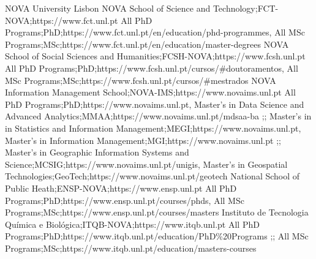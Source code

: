 \begin{ntUniversity}{NOVA University Lisbon}
             {{NOVA School of Science and Technology};{FCT-NOVA};{https://www.fct.unl.pt}}
             {{All PhD Programs};{PhD};{https://www.fct.unl.pt/en/education/phd-programmes},%
              {All MSc Programs};{MSc};{https://www.fct.unl.pt/en/education/master-degrees}}
             {{NOVA School of Social Sciences and  Humanities};{FCSH-NOVA};{https://www.fcsh.unl.pt}}
             {{All PhD Programs};{PhD};{https://www.fcsh.unl.pt/cursos/\#doutoramentos},%
              {All MSc Programs};{MSc};{https://www.fcsh.unl.pt/cursos/\#mestrados}}
             {{NOVA Information Management School};{NOVA-IMS};{https://www.novaims.unl.pt}}
             {{All PhD Programs};{PhD};{https://www.novaims.unl.pt},%
              {Master's in Data Science and Advanced Analytics};{MMAA};{https://www.novaims.unl.pt/mdsaa-ba}}
             {;;}
             {{Master's in in Statistics and Information Management};{MEGI};{https://www.novaims.unl.pt},%
              {Master's in Information Management};{MGI};{https://www.novaims.unl.pt}}
             {;;}
             {{Master's in Geographic Information Systems and Science};{MCSIG};{https://www.novaims.unl.pt/unigis},%
              {Master's in Geospatial Technologies};{GeoTech};{https://www.novaims.unl.pt/geotech}}
             {{National School of Public Heath};{ENSP-NOVA};{https://www.ensp.unl.pt}}
             {{All PhD Programs};{PhD};{https://www.ensp.unl.pt/courses/phds},%
              {All MSc Programs};{MSc};{https://www.ensp.unl.pt/courses/masters}}
             {{Instituto de Tecnologia Química e Biológica};{ITQB-NOVA};{https://www.itqb.unl.pt}}
             {{All PhD Programs};{PhD};{https://www.itqb.unl.pt/education/PhD\%20Programs}}
             {;;}
             {{All MSc Programs};{MSc};{https://www.itqb.unl.pt/education/masters-courses}}
\end{ntUniversity}

